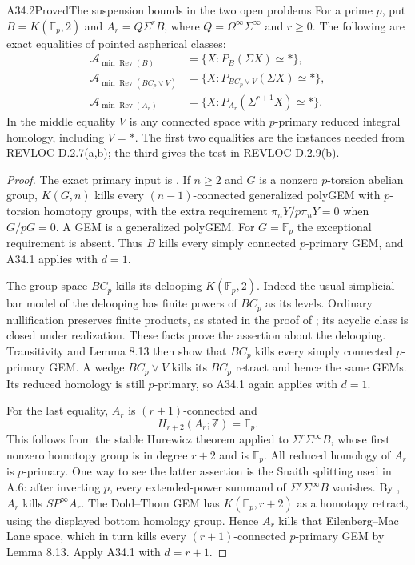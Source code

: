 \begin{claim}{A34.2}{Proved}{The suspension bounds in the two open problems}\label{A342}
For a prime $p$, put $B=K(\mathbb F_p,2)$ and $A_r=Q\Sigma^rB$,
where $Q=\Omega^\infty\Sigma^\infty$ and $r\geq0$.  The following
are exact equalities of pointed aspherical classes:
\[
\begin{aligned}
 \mathcal A_{\min\operatorname{Rev}(B)}
   &=\{X:P_B(\Sigma X)\simeq *\},\\
 \mathcal A_{\min\operatorname{Rev}(BC_p\vee V)}
   &=\{X:P_{BC_p\vee V}(\Sigma X)\simeq *\},\\
 \mathcal A_{\min\operatorname{Rev}(A_r)}
   &=\{X:P_{A_r}(\Sigma^{r+1}X)\simeq *\}.
\end{aligned}
\tag{A34.2.1}
\]
In the middle equality $V$ is any connected space with $p$-primary
reduced integral homology, including $V=*$.  The first two equalities
are the instances needed from REVLOC D.2.7(a,b); the third gives the
test in REVLOC D.2.9(b).
\end{claim}
\begin{proof}
The exact primary input is
\citet[Lemma 8.13]{ABousfield1997}.  If $n\geq2$ and $G$ is a
nonzero $p$-torsion abelian group, $K(G,n)$ kills every
$(n-1)$-connected generalized polyGEM with $p$-torsion homotopy
groups, with the extra requirement
$\pi_nY/p\pi_nY=0$ when $G/pG=0$.  A GEM is a generalized polyGEM.
For $G=\mathbb F_p$ the exceptional requirement is absent.
Thus $B$ kills every simply connected $p$-primary GEM, and A34.1
applies with $d=1$.

The group space $BC_p$ kills its delooping $K(\mathbb F_p,2)$.
Indeed the usual simplicial bar model of the delooping has finite
powers of $BC_p$ as its levels.  Ordinary nullification preserves
finite products, as stated in the proof of
\citet[Theorem 1.7]{ABousfield1996}; its acyclic class is closed
under realization.  These facts prove the assertion about the
delooping.  Transitivity and Lemma 8.13 then show that $BC_p$ kills
every simply connected $p$-primary GEM.  A wedge $BC_p\vee V$ kills
its $BC_p$ retract and hence the same GEMs.  Its reduced homology is
still $p$-primary, so A34.1 again applies with $d=1$.

For the last equality, $A_r$ is $(r+1)$-connected and
\[
 H_{r+2}(A_r;\mathbb Z)=\mathbb F_p.
\]
This follows from the stable Hurewicz theorem applied to
$\Sigma^r\Sigma^\infty B$, whose first nonzero homotopy group is
in degree $r+2$ and is $\mathbb F_p$.  All reduced homology of $A_r$
is $p$-primary.  One way to see the latter assertion is the Snaith
splitting used in A.6: after inverting $p$, every extended-power
summand of $\Sigma^r\Sigma^\infty B$ vanishes.
By \citet[Corollary 3.2(ii)]{ABousfield1996}, $A_r$ kills
$SP^\infty A_r$.  The Dold--Thom GEM has
$K(\mathbb F_p,r+2)$ as a homotopy retract, using the displayed
bottom homology group.  Hence $A_r$ kills that Eilenberg--Mac Lane
space, which in turn kills every $(r+1)$-connected $p$-primary GEM
by Lemma 8.13.  Apply A34.1 with $d=r+1$.
\end{proof}

